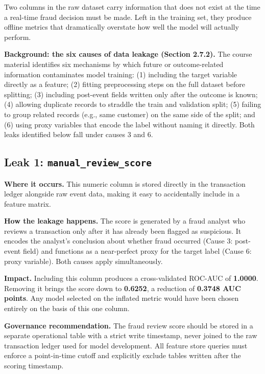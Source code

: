 \documentclass[11pt,a4paper]{article}
\begin{document}
Two columns in the raw dataset carry information that does not exist at the time a
real-time fraud decision must be made. Left in the training set, they produce offline
metrics that dramatically overstate how well the model will actually perform.

\textbf{Background: the six causes of data leakage (Section 2.7.2).} The course
material identifies six mechanisms by which future or outcome-related information
contaminates model training: (1) including the target variable directly as a feature;
(2) fitting preprocessing steps on the full dataset before splitting; (3) including
post-event fields written only after the outcome is known; (4) allowing duplicate
records to straddle the train and validation split; (5) failing to group related records
(e.g., same customer) on the same side of the split; and (6) using proxy variables that
encode the label without naming it directly. Both leaks identified below fall under
causes 3 and 6.

\subsection*{Leak 1: \texttt{manual\_review\_score}}

\textbf{Where it occurs.} This numeric column is stored directly in the transaction ledger
alongside raw event data, making it easy to accidentally include in a feature matrix.

\textbf{How the leakage happens.} The score is generated by a fraud analyst who reviews a
transaction only after it has already been flagged as suspicious. It encodes the analyst's
conclusion about whether fraud occurred (Cause 3: post-event field) and functions as a
near-perfect proxy for the target label (Cause 6: proxy variable). Both causes apply simultaneously.

\textbf{Impact.} Including this column produces a cross-validated ROC-AUC of
\textbf{1.0000}. Removing it brings the score down to \textbf{0.6252}, a reduction of
\textbf{0.3748 AUC points}. Any model selected on the inflated metric would have been
chosen entirely on the basis of this one column.

\textbf{Governance recommendation.} The fraud review score should be stored in a separate
operational table with a strict write timestamp, never joined to the raw transaction ledger
used for model development. All feature store queries must enforce a point-in-time cutoff
and explicitly exclude tables written after the scoring timestamp.
\end{document}
